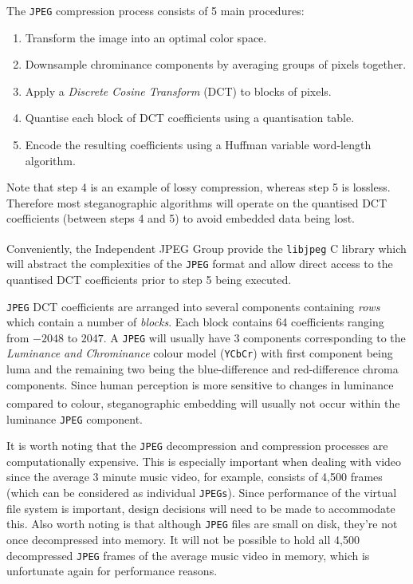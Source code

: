 \documentclass[paper=a4, fontsize=11pt,twoside]{scrartcl}
\numberwithin{table}{section}
\numberwithin{figure}{section}
\numberwithin{algorithm}{section}
\begin{document}
The \texttt{JPEG} compression process consists of 5 main procedures:
\begin{enumerate}
	\item Transform the image into an optimal color space. 
	\item Downsample chrominance components by averaging groups of pixels together.
	\item Apply a \textit{Discrete Cosine Transform} (DCT) to blocks of pixels. 
	\item Quantise each block of DCT coefficients using a quantisation table. 
	\item Encode the resulting coefficients using a Huffman variable word-length algorithm. 
\end{enumerate}

\noindent
Note that step 4 is an example of lossy compression, whereas step 5 is lossless. Therefore most steganographic algorithms will operate on the quantised DCT coefficients (between steps 4 and 5) to avoid embedded data being lost.

Conveniently, the Independent JPEG Group provide the \texttt{libjpeg} C library\textsuperscript{\cite{libjpeg}} which will abstract the complexities of the \texttt{JPEG} format and allow direct access to the quantised DCT coefficients prior to step 5 being executed.

\texttt{JPEG} DCT coefficients are arranged into several components containing \textit{rows} which contain a number of \textit{blocks}. Each block contains 64 coefficients ranging from $-2048$ to $2047$. A \texttt{JPEG} will usually have 3 components corresponding to the \textit{Luminance and Chrominance} colour model (\texttt{YCbCr}) with first component being luma and the remaining two being the blue-difference and red-difference chroma components. Since human perception is more sensitive to changes in luminance compared to colour\textsuperscript{\cite{sensitive}}, steganographic embedding will usually not occur within the luminance \texttt{JPEG} component.

It is worth noting that the \texttt{JPEG} decompression and compression processes are computationally expensive. This is especially important when dealing with video since the average 3 minute music video, for example, consists of 4,500 frames (which can be considered as individual \texttt{JPEGs}). Since performance of the virtual file system is important, design decisions will need to be made to accommodate this. Also worth noting is that although \texttt{JPEG} files are small on disk, they're not once decompressed into memory. It will not be possible to hold all 4,500 decompressed \texttt{JPEG} frames of the average music video in memory, which is unfortunate again for performance reasons.
\end{document}

